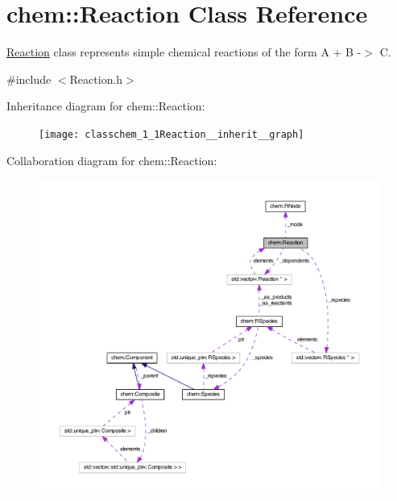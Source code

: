 \hypertarget{classchem_1_1Reaction}{\section{chem\-:\-:Reaction Class Reference}
\label{classchem_1_1Reaction}
}


\hyperlink{classchem_1_1Reaction}{Reaction} class represents simple chemical reactions of the form A + B -\/$>$ C.  




{\ttfamily \#include $<$Reaction.\-h$>$}



Inheritance diagram for chem\-:\-:Reaction\-:
\nopagebreak
\begin{figure}[H]
\begin{center}
\leavevmode
\texttt{[image: classchem\_1\_1Reaction\_\_inherit\_\_graph]}
\end{center}
\end{figure}


Collaboration diagram for chem\-:\-:Reaction\-:\nopagebreak
\begin{figure}[H]
\begin{center}
\leavevmode
\includegraphics[width=350pt]{classchem_1_1Reaction__coll__graph}
\end{center}
\end{figure}

